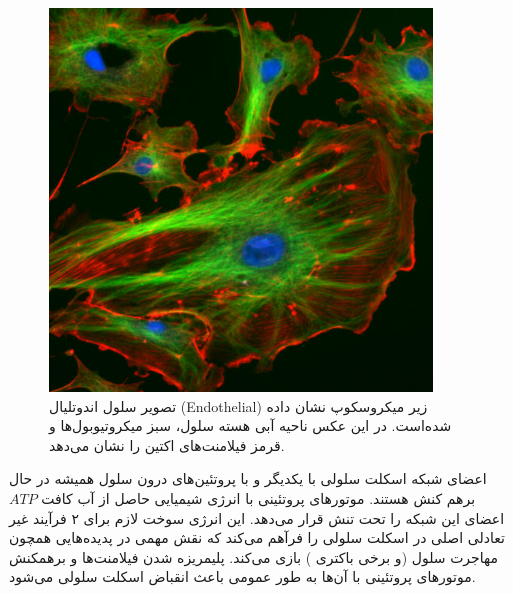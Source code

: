 \begin{figure}[h]
\begin{center}
\includegraphics[width=4in]{Figs/FluorescentCells}
\caption{
تصویر سلول اندوتلیال (Endothelial) زیر میکروسکوپ نشان داده شده‌است. در این عکس  ناحیه آبی هسته سلول،‌ سبز میکروتیوبول‌ها و قرمز فیلامنت‌های اکتین را نشان می‌دهد.\cite{wiki-cell}
}
\label{fig:wiki-cyto}
\end{center}
\end{figure}
اعضای شبکه اسکلت سلولی با یکدیگر و با پروتئین‌های درون سلول همیشه در حال برهم کنش هستند. موتورهای پروتئینی با انرژی شیمیایی حاصل از آب کافت $ATP$ اعضای این شبکه را تحت تنش قرار می‌دهد. این انرژی سوخت لازم برای ۲ فرآیند غیر تعادلی اصلی در اسکلت سلولی را فرآهم می‌کند که نقش مهمی در پدیده‌هایی همچون مهاجرت سلول (و برخی باکتری \cite{Mignot853}) بازی می‌کند. پلیمریزه شدن فیلامنت‌ها و برهمکنش موتور‌های پروتئینی با آن‌ها به طور عمومی باعث انقباض اسکلت سلولی می‌شود\cite{Hawkins:2011eu}. 


